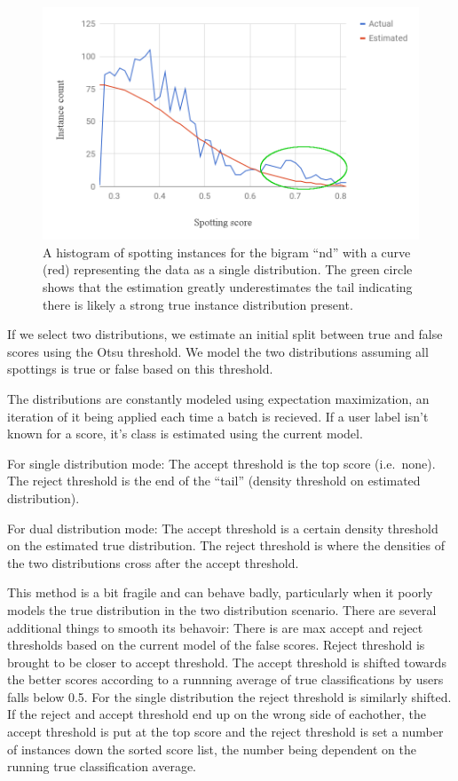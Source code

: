 \documentclass[ms,electronic,twosidetoc,letterpaper,chaptercenter,parttop,lof,lot]{byumsphd}
\begin{document}
\begin{figure}
    \centering
    \includegraphics[width=.75\textwidth]{tail_dist_ex}
    \caption{A histogram of spotting instances for the bigram ``nd'' with a curve (red) representing the data as a single distribution. The green circle shows that the estimation greatly underestimates the tail indicating there is likely a strong true instance distribution present.
    }
    \label{fig:tail_dist_ex}
\end{figure}

If we select two distributions, we estimate an initial split between true and false scores using the Otsu threshold. We model the two distributions assuming all spottings is true or false based on this threshold.

The distributions are constantly modeled using expectation maximization, an iteration of it being applied each time a batch is recieved. If a user label isn't known for a score, it's class is estimated using the current model.



For single distribution mode:
The accept threshold is the top score (i.e.~none).
The reject threshold is the end of the ``tail'' (density threshold on estimated distribution).

For dual distribution mode:
The accept threshold is a certain density threshold on the estimated true distribution.
The reject threshold is where the densities of the two distributions cross after the accept threshold.

This method is a bit fragile and can behave badly, particularly when it poorly models the true distribution in the two distribution scenario. There are several additional things to smooth its behavoir: 
There is are max accept and reject thresholds based on the current model of the false scores.
Reject threshold is brought to be closer to accept threshold.
The accept threshold is  shifted towards the better scores according to a runnning average of true classifications by users falls below 0.5.
For the single distribution the reject threshold is similarly shifted.
If the reject and accept threshold end up on the wrong side of eachother, the accept threshold is put at the top score and the reject threshold is set a number of instances down the sorted score list, the number being dependent on the running true classification average.
\end{document}

